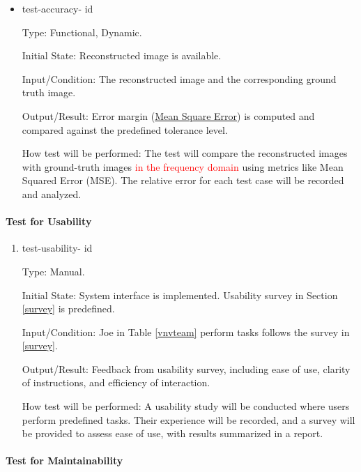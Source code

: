 \documentclass[12pt, titlepage]{article}
\newcounter{testnum}
\newcommand{\dthetestnum}{id\thetestnum}
\newcommand{\add}{\textcolor{red}}
\begin{document}
\begin{itemize}

\item{test-accuracy- \label{id7} \dthetestnum\\}

Type: Functional, Dynamic.

Initial State: Reconstructed image is available.

Input/Condition: The reconstructed image and the corresponding ground truth image.

Output/Result: Error margin (\href{https://en.wikipedia.org/wiki/Mean_squared_error}{Mean Square Error}) is computed and compared against the predefined tolerance level.

How test will be performed: The test will compare the reconstructed images with
ground-truth images \add{in the frequency domain} using metrics like Mean Squared Error (MSE). The relative
error for each test case will be recorded and analyzed.

\end{itemize}

\paragraph{Test for Usability}

\begin{enumerate}

\item{test-usability- \label{id8} \dthetestnum\\}

Type: Manual.

Initial State: System interface is implemented. Usability survey in Section
\ref{survey} is predefined.

Input/Condition: Joe in Table \ref{vnvteam} perform tasks follows the survey in \ref{survey}.

Output/Result: Feedback from usability survey, including ease of use, clarity of
instructions, and efficiency of interaction.

How test will be performed: A usability study will be conducted where users
perform predefined tasks. Their experience will be recorded, and a survey will
be provided to assess ease of use, with results summarized in a report.
\end{enumerate}


\paragraph{Test for Maintainability}
\end{document}
